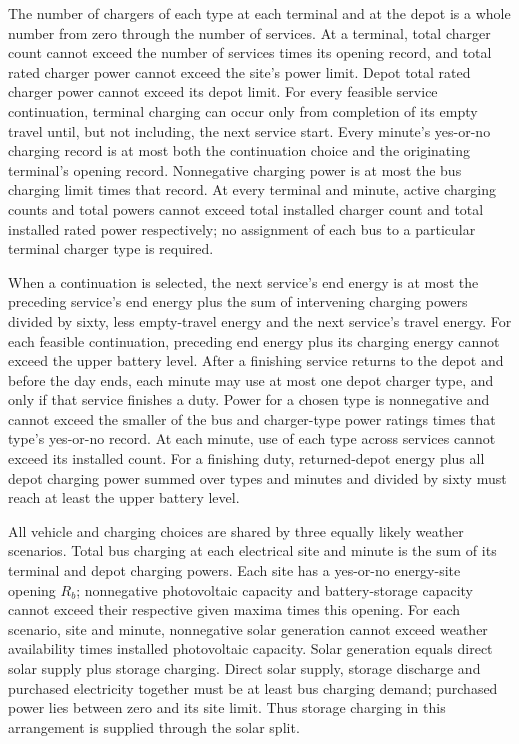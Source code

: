 \documentclass[10pt]{article}
\begin{document}
The number of chargers of each type at each terminal and at the depot is a whole number from zero through the number of services. At a terminal, total charger count cannot exceed the number of services times its opening record, and total rated charger power cannot exceed the site's power limit. Depot total rated charger power cannot exceed its depot limit. For every feasible service continuation, terminal charging can occur only from completion of its empty travel until, but not including, the next service start. Every minute's yes-or-no charging record is at most both the continuation choice and the originating terminal's opening record. Nonnegative charging power is at most the bus charging limit times that record. At every terminal and minute, active charging counts and total powers cannot exceed total installed charger count and total installed rated power respectively; no assignment of each bus to a particular terminal charger type is required.

When a continuation is selected, the next service's end energy is at most the preceding service's end energy plus the sum of intervening charging powers divided by sixty, less empty-travel energy and the next service's travel energy. For each feasible continuation, preceding end energy plus its charging energy cannot exceed the upper battery level. After a finishing service returns to the depot and before the day ends, each minute may use at most one depot charger type, and only if that service finishes a duty. Power for a chosen type is nonnegative and cannot exceed the smaller of the bus and charger-type power ratings times that type's yes-or-no record. At each minute, use of each type across services cannot exceed its installed count. For a finishing duty, returned-depot energy plus all depot charging power summed over types and minutes and divided by sixty must reach at least the upper battery level.

All vehicle and charging choices are shared by three equally likely weather scenarios. Total bus charging at each electrical site and minute is the sum of its terminal and depot charging powers. Each site has a yes-or-no energy-site opening $R_b$; nonnegative photovoltaic capacity and battery-storage capacity cannot exceed their respective given maxima times this opening. For each scenario, site and minute, nonnegative solar generation cannot exceed weather availability times installed photovoltaic capacity. Solar generation equals direct solar supply plus storage charging. Direct solar supply, storage discharge and purchased electricity together must be at least bus charging demand; purchased power lies between zero and its site limit. Thus storage charging in this arrangement is supplied through the solar split.
\end{document}
